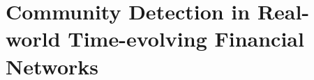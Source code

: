 
\section{Community Detection in Real-world Time-evolving  Financial Networks}
\label{sec:communityDetectionRealWorldTimeEvolvingFinancialNetworks}

